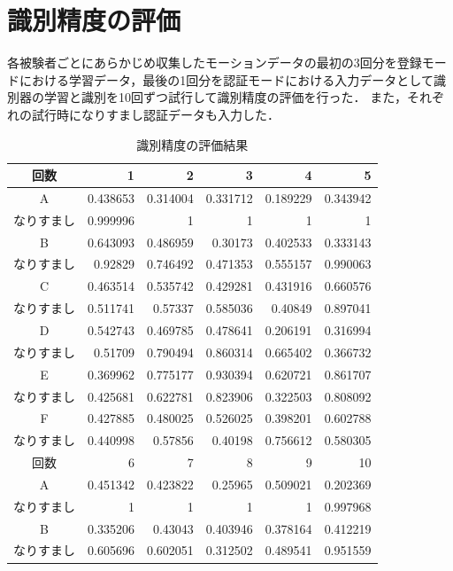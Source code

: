 \section{識別精度の評価}
各被験者ごとにあらかじめ収集したモーションデータの最初の3回分を登録モードにおける学習データ，最後の1回分を認証モードにおける入力データとして識別器の学習と識別を10回ずつ試行して識別精度の評価を行った．
また，それぞれの試行時になりすまし認証データも入力した．

\begin{table}[btph]
  \centering
  \caption{識別精度の評価結果}
  \label{auth-result}
  \begin{tabular}{|c|r|r|r|r|r|} \hline
    回数 & 1 & 2 & 3 & 4 & 5 \\ \hline
    A & 0.438653 & 0.314004 & 0.331712 & 0.189229 & 0.343942 \\
    なりすまし & 0.999996 & 1 & 1 & 1 & 1 \\ \hline
    B & 0.643093 & 0.486959 & 0.30173 & 0.402533 & 0.333143 \\
    なりすまし & 0.92829 & 0.746492 & 0.471353 & 0.555157 & 0.990063 \\ \hline
    C & 0.463514 & 0.535742 & 0.429281 & 0.431916 & 0.660576 \\
    なりすまし & 0.511741 & 0.57337 & 0.585036 & 0.40849 & 0.897041 \\ \hline
    D & 0.542743 & 0.469785 & 0.478641 & 0.206191 & 0.316994 \\
    なりすまし & 0.51709 & 0.790494 & 0.860314 & 0.665402 & 0.366732 \\ \hline
    E & 0.369962 & 0.775177 & 0.930394 & 0.620721 & 0.861707 \\
    なりすまし & 0.425681 & 0.622781 & 0.823906 & 0.322503 & 0.808092 \\ \hline
    F & 0.427885 & 0.480025 & 0.526025 & 0.398201 & 0.602788 \\
    なりすまし & 0.440998 & 0.57856 & 0.40198 & 0.756612 & 0.580305 \\ \hline \hline
    回数 & 6 & 7 & 8 & 9 & 10 \\ \hline
    A & 0.451342 & 0.423822 & 0.25965 & 0.509021 & 0.202369 \\
    なりすまし & 1 & 1 & 1 & 1 & 0.997968 \\ \hline
    B & 0.335206 & 0.43043 & 0.403946 & 0.378164 & 0.412219 \\
    なりすまし & 0.605696 & 0.602051 & 0.312502 & 0.489541 & 0.951559 \\ \hline

\end{tabular}
\end{table}

